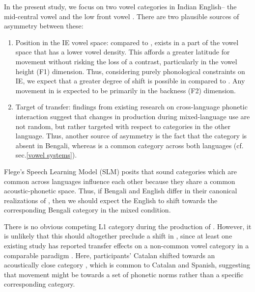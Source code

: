 \documentclass[12 pt]{article}
\newcommand{\nt}[1]{\textipa{[#1]}} %
\begin{document}
In the present study, we focus on two vowel categories in Indian English-- the mid-central vowel \nt{2} and the low front vowel \nt{\ae}. There are two plausible sources of asymmetry between these:
\begin{enumerate}
	\item Position in the IE vowel space: compared to \nt{\ae}, \nt{2} exists in a part of the vowel space that has a lower vowel density. This affords a greater latitude for movement without risking the loss of a contrast, particularly in the vowel height (F1) dimension. Thus, considering purely phonological constraints on IE, we expect that a greater degree of shift is possible in \nt{2} compared to \nt{\ae}. Any movement in \nt{\ae} is expected to be primarily in the backness (F2) dimension.
	\item Target of transfer: findings from existing research on cross-language phonetic interaction suggest that changes in production during mixed-language use are not random, but rather targeted with respect to categories in the other language. Thus, another source of asymmetry is the fact that the category \nt{2} is absent in Bengali, whereas \nt{\ae} is a common category across both languages (cf. sec.\ref{vowel systems}).
\end{enumerate}


Flege's Speech Learning Model (SLM) \citeyearpar{flege1995second,flege2007language} posits that sound categories which are common across languages influence each other because they share a common acoustic-phonetic space. Thus, if Bengali and English differ in their canonical realizations of \nt{\ae}, then we should expect the English \nt{\ae} to shift towards the corresponding Bengali category in the mixed condition. 


There is no obvious competing L1 category during the production of \nt{2}. However, it is unlikely that this should altogether preclude a shift in \nt{2}, since at least one existing study has reported transfer effects on a non-common vowel category in a comparable paradigm \citep{simonet2014phonetic}. Here, participants' Catalan \nt{O} shifted towards an acoustically close category \nt{o}, which is common to Catalan and Spanish, suggesting that movement might be towards a set of phonetic norms rather than a specific corresponding category. 
\end{document}
